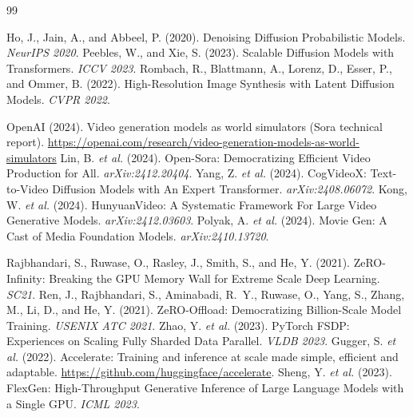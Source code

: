 \documentclass[11pt, letterpaper]{article}
\begin{document}
\begin{thebibliography}{99}

 Ho, J., Jain, A., and Abbeel, P. (2020). Denoising Diffusion Probabilistic Models. \textit{NeurIPS 2020}.
 Peebles, W., and Xie, S. (2023). Scalable Diffusion Models with Transformers. \textit{ICCV 2023}.
 Rombach, R., Blattmann, A., Lorenz, D., Esser, P., and Ommer, B. (2022). High-Resolution Image Synthesis with Latent Diffusion Models. \textit{CVPR 2022}.

 OpenAI (2024). Video generation models as world simulators (Sora technical report). \url{https://openai.com/research/video-generation-models-as-world-simulators}
 Lin, B. \textit{et al.} (2024). Open-Sora: Democratizing Efficient Video Production for All. \textit{arXiv:2412.20404}.
 Yang, Z. \textit{et al.} (2024). CogVideoX: Text-to-Video Diffusion Models with An Expert Transformer. \textit{arXiv:2408.06072}.
 Kong, W. \textit{et al.} (2024). HunyuanVideo: A Systematic Framework For Large Video Generative Models. \textit{arXiv:2412.03603}.
 Polyak, A. \textit{et al.} (2024). Movie Gen: A Cast of Media Foundation Models. \textit{arXiv:2410.13720}.

 Rajbhandari, S., Ruwase, O., Rasley, J., Smith, S., and He, Y. (2021). ZeRO-Infinity: Breaking the GPU Memory Wall for Extreme Scale Deep Learning. \textit{SC21}.
 Ren, J., Rajbhandari, S., Aminabadi, R.~Y., Ruwase, O., Yang, S., Zhang, M., Li, D., and He, Y. (2021). ZeRO-Offload: Democratizing Billion-Scale Model Training. \textit{USENIX ATC 2021}.
 Zhao, Y. \textit{et al.} (2023). PyTorch FSDP: Experiences on Scaling Fully Sharded Data Parallel. \textit{VLDB 2023}.
 Gugger, S. \textit{et al.} (2022). Accelerate: Training and inference at scale made simple, efficient and adaptable. \url{https://github.com/huggingface/accelerate}.
 Sheng, Y. \textit{et al.} (2023). FlexGen: High-Throughput Generative Inference of Large Language Models with a Single GPU. \textit{ICML 2023}.


\end{thebibliography}
\end{document}
